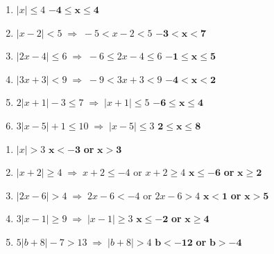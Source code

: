 \documentclass[11pt]{article}
\begin{document}
\vspace{8pt}

\begin{tcolorbox}[anskey, title={Section B \textemdash\ Inequalities $(\leq\;/\;<)$}]
\begin{enumerate}[leftmargin=1.8em, itemsep=4pt, start=6]
  \item $|x|\leq 4$ \hfill $\boldsymbol{-4\leq x\leq 4}$
  \item $|x-2|<5 \;\Rightarrow\; -5<x-2<5$ \hfill $\boldsymbol{-3<x<7}$
  \item $|2x-4|\leq 6 \;\Rightarrow\; -6\leq 2x-4\leq 6$ \hfill $\boldsymbol{-1\leq x\leq 5}$
  \item $|3x+3|<9 \;\Rightarrow\; -9<3x+3<9$ \hfill $\boldsymbol{-4<x<2}$
  \item $2|x+1|-3\leq 7 \;\Rightarrow\; |x+1|\leq 5$ \hfill $\boldsymbol{-6\leq x\leq 4}$
  \item $3|x-5|+1\leq 10 \;\Rightarrow\; |x-5|\leq 3$ \hfill $\boldsymbol{2\leq x\leq 8}$
\end{enumerate}
\end{tcolorbox}

\vspace{8pt}

\begin{tcolorbox}[anskey, title={Section C \textemdash\ Inequalities $(\geq\;/\;>)$}]
\begin{enumerate}[leftmargin=1.8em, itemsep=4pt, start=12]
  \item $|x|>3$ \hfill $\boldsymbol{x<-3}$ \textbf{ or } $\boldsymbol{x>3}$
  \item $|x+2|\geq 4 \;\Rightarrow\; x+2\leq -4$ or $x+2\geq 4$ \hfill $\boldsymbol{x\leq -6}$ \textbf{ or } $\boldsymbol{x\geq 2}$
  \item $|2x-6|>4 \;\Rightarrow\; 2x-6<-4$ or $2x-6>4$ \hfill $\boldsymbol{x<1}$ \textbf{ or } $\boldsymbol{x>5}$
  \item $3|x-1|\geq 9 \;\Rightarrow\; |x-1|\geq 3$ \hfill $\boldsymbol{x\leq -2}$ \textbf{ or } $\boldsymbol{x\geq 4}$
  \item $5|b+8|-7>13 \;\Rightarrow\; |b+8|>4$ \hfill $\boldsymbol{b<-12}$ \textbf{ or } $\boldsymbol{b>-4}$
\end{enumerate}
\end{tcolorbox}

\vspace{8pt}
\end{document}
